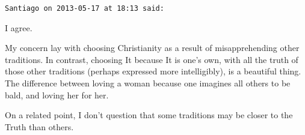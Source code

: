 \begin{footnotesize}
\begin{sffamily}
\hfill

\texttt{Santiago on 2013-05-17 at 18:13 said:}

I agree.

My concern lay with choosing Christianity as a result of misapprehending other traditions. In contrast, choosing It because It is one's own, with all the truth of those other traditions (perhaps expressed more intelligibly), is a beautiful thing. The difference between loving a woman because one imagines all others to be bald, and loving her for her.

On a related point, I don't question that some traditions may be closer to the Truth than others.

\hfill

\end{sffamily}
\end{footnotesize}

